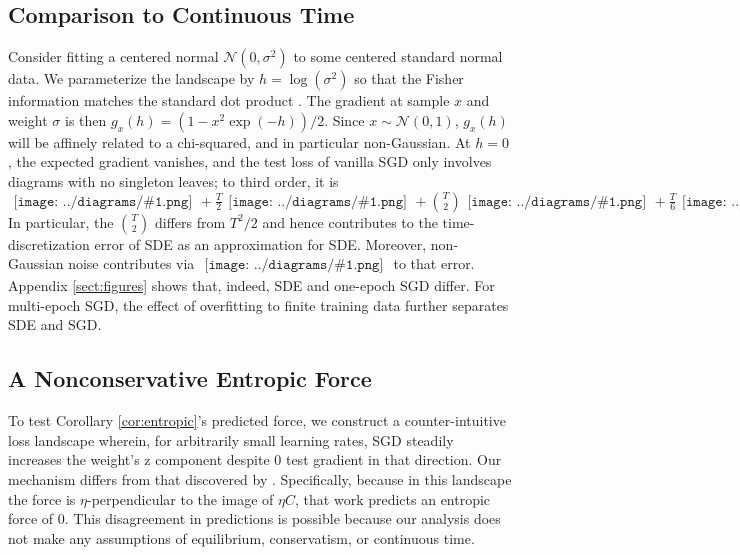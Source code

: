 \documentclass{article}
\theoremstyle{plain}
\theoremstyle{definition}
\newcommand{\Nn}{\mathcal{N}}
\newcommand{\sdia}[1]{\begin{gathered}\texttt{[image: ../diagrams/\#1.png]}\end{gathered}}
\begin{document}
    \subsection{Comparison to Continuous Time}
        Consider fitting a centered normal $\Nn(0, \sigma^2)$ to some centered
        standard normal data.  We parameterize the landscape by
        $h=\log(\sigma^2)$ so that the Fisher information matches the standard
        dot product \citep{am98}.  The gradient at sample $x$ and weight
        $\sigma$ is then $g_x(h) = (1-x^2\exp(-h))/2$.  Since $x\sim \Nn(0,
        1)$, $g_x(h)$ will be affinely related to a chi-squared, and in
        particular non-Gaussian.  At $h=0$, the expected gradient vanishes, and
        the test loss of vanilla SGD only involves diagrams with no singleton
        leaves; to third order, it is
        $
            \sdia{(0)()}
            +\frac{T}{2} \sdia{c(01-2)(02-12)}
            +{T\choose 2} \sdia{c(03-1-2)(01-12-23)}
            +\frac{T}{6} \sdia{c(012-3)(03-13-23)}
        $
        In particular, the ${T\choose 2}$ differs from $T^2/2$ and hence
        contributes to the time-discretization error of SDE as an approximation
        for SDE.  Moreover, non-Gaussian noise contributes via
        $\sdia{c(012-3)(03-13-23)}$ to that error.  Appendix \ref{sect:figures}
        shows that, indeed, SDE and one-epoch SGD differ.  For multi-epoch
        SGD, the effect of overfitting to finite training data further
        separates SDE and SGD.


    \subsection{A Nonconservative Entropic Force} \label{subsect:entropic}
        To test Corollary \ref{cor:entropic}'s predicted force, 
        we construct a counter-intuitive loss landscape wherein, for
        arbitrarily small learning rates, SGD steadily increases the weight's
        z component despite 0 test gradient in that direction.
        Our mechanism differs from that discovered by \citet{ch18}.
        Specifically, because in this landscape the force is
        $\eta$-perpendicular to the image of $\eta C$, that work predicts an
        entropic force of $0$.  This disagreement in predictions is possible
        because our analysis does not make any assumptions of equilibrium,
        conservatism, or continuous time.
\end{document}
